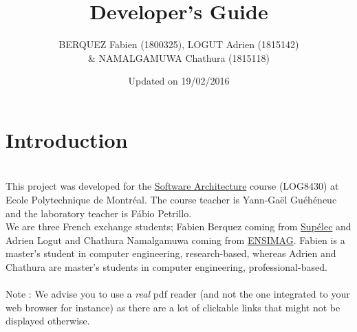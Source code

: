 \documentclass{report}
\title{Developer's Guide}
\author{BERQUEZ Fabien  (1800325), LOGUT Adrien (1815142) \\ \& NAMALGAMUWA Chathura (1815118)}
\date{Updated on 19/02/2016}
\begin{document}
\maketitle

\tableofcontents

\newtoggle{diag}

\toggletrue{diag}


\chapter{Introduction}

 \\

This project was developed for the \href{http://www.polymtl.ca/etudes/cours/details.php?sigle=LOG8430}{Software Architecture} course (LOG8430) at Ecole Polytechnique de Montréal. The course teacher is Yann-Gaël Guéhéneuc and the laboratory teacher is Fábio Petrillo. \\

We are three French exchange students; Fabien Berquez coming from \href{http://www.supelec.fr/374_p_14603/welcome.html}{Supélec} and Adrien Logut and Chathura Namalgamuwa coming from \href{http://ensimag.grenoble-inp.fr/welcome/}{ENSIMAG}. Fabien is a master's student in computer engineering, research-based, whereas Adrien and Chathura are master's students in computer engineering, professional-based. \\ 

\ \\

Note : We advise you to use a \textit{real} pdf reader (and not the one integrated to your web browser for instance) as there are a lot of clickable links that might not be displayed otherwise.
\end{document}
